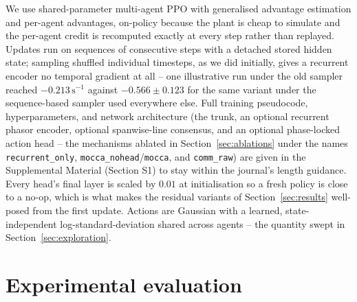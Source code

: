 \documentclass[journal]{new-aiaa}
\begin{document}
We use shared-parameter multi-agent PPO
\cite{schulman2017ppo,yu2022mappo} with generalised advantage estimation
\cite{schulman2016gae} and per-agent advantages, on-policy because the
plant is cheap to simulate and the per-agent credit is recomputed exactly
at every step rather than replayed. Updates run on sequences of consecutive
steps with a detached stored hidden state; sampling shuffled individual
timesteps, as we did initially, gives a recurrent encoder no temporal
gradient at all \cite{hausknecht2015drqn} -- one illustrative run under the
old sampler reached $-0.213\,\mathrm{s}^{-1}$ against $-0.566\pm0.123$ for
the same variant under the sequence-based sampler used everywhere else.
Full training pseudocode, hyperparameters, and network architecture
(the trunk, an optional recurrent phasor encoder, optional spanwise-line
consensus, and an optional phase-locked action head -- the mechanisms
ablated in Section~\ref{sec:ablations} under the names \texttt{recurrent\_only},
\texttt{mocca\_nohead}/\texttt{mocca}, and \texttt{comm\_raw}) are given in
the Supplemental Material (Section S1) to stay within the journal's
length guidance. Every head's final layer is scaled by $0.01$ at
initialisation so a fresh policy is close to a no-op, which is what makes
the residual variants of Section~\ref{sec:results} well-posed from the
first update. Actions are Gaussian with a learned, state-independent
log-standard-deviation shared across agents -- the quantity swept in
Section~\ref{sec:exploration}.

\section{Experimental evaluation}
\label{sec:design}
\end{document}
